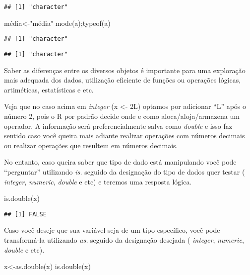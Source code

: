 \documentclass[
]{book}
\newenvironment{Shaded}{\begin{snugshade}}{\end{snugshade}}
\newcommand{\FunctionTok}[1]{\textcolor[rgb]{0.00,0.00,0.00}{#1}}
\newcommand{\NormalTok}[1]{#1}
\newcommand{\OtherTok}[1]{\textcolor[rgb]{0.56,0.35,0.01}{#1}}
\newcommand{\StringTok}[1]{\textcolor[rgb]{0.31,0.60,0.02}{#1}}
\begin{document}
\begin{verbatim}
## [1] "character"
\end{verbatim}

\begin{Shaded}
\begin{Highlighting}[]
\NormalTok{média}\OtherTok{\textless{}{-}}\StringTok{"média"}
\FunctionTok{mode}\NormalTok{(a);}\FunctionTok{typeof}\NormalTok{(a)}
\end{Highlighting}
\end{Shaded}

\begin{verbatim}
## [1] "character"
\end{verbatim}

\begin{verbatim}
## [1] "character"
\end{verbatim}

Saber as diferenças entre os diversos objetos é importante para uma exploração mais adequada dos dados, utilização eficiente de funções ou operações lógicas, artiméticas, estatísticas e etc.

Veja que no caso acima em \emph{integer} (x \textless- 2L) optamos por adicionar ``L'' após o número 2, pois o R por padrão decide onde e como aloca/aloja/armazena um operador. A informação será preferencialmente salva como \emph{double} e isso faz sentido caso você queira mais adiante realizar operações com números decimais ou realizar operações que resultem em números decimais.

No entanto, caso queira saber que tipo de dado está manipulando você pode ``perguntar'' utilizando \emph{is.} seguido da designação do tipo de dados quer testar ( \emph{integer}, \emph{numeric}, \emph{double} e etc) e teremos uma resposta lógica.

\begin{Shaded}
\begin{Highlighting}[]
\FunctionTok{is.double}\NormalTok{(x) }
\end{Highlighting}
\end{Shaded}

\begin{verbatim}
## [1] FALSE
\end{verbatim}

Caso você deseje que sua variável seja de um tipo específico, você pode transformá-la utilizando \emph{as.} seguido da designação desejada ( \emph{integer}, \emph{numeric}, \emph{double} e etc).

\begin{Shaded}
\begin{Highlighting}[]
\NormalTok{x}\OtherTok{\textless{}{-}}\FunctionTok{as.double}\NormalTok{(x)}
\FunctionTok{is.double}\NormalTok{(x)}
\end{Highlighting}
\end{Shaded}
\end{document}
